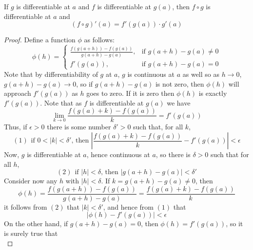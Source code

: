 \documentclass[12pt, a4paper, oneside, openright, titlepage]{book}
\begin{document}
\begin{thm}
    If $g$ is differentiable at $a$ and $f$ is differentiable at $g(a)$, then $f\circ g$ is differentiable at $a$ and $$(f\circ g)'(a) = f'(g(a))\cdot g'(a)$$
\end{thm}
\begin{proof}
    Define a function $\phi$ as follows: \begin{equation}
        \phi(h) = \left\{\begin{array}{ll}
            \frac{f(g(a+h)) - f(g(a))}{g(a+h)-g(a)}, & \text{if } g(a+h)-g(a) \neq 0 \\
            f'(g(a)), & \text{if } g(a+h) - g(a) = 0
        \end{array}\right.
    \end{equation}
    Note that by differentiability of $g$ at $a$, $g$ is continuous at $a$ as well so as $h\rightarrow 0$, $g(a+h)-g(a)\rightarrow 0$, so if $g(a+h)-g(a)$ is not zero, then $\phi(h)$ will approach $f'(g(a))$ as $h$ goes to zero. If it is zero then $\phi(h)$ is exactly $f'(g(a))$. Note that as $f$ is differentiable at $g(a)$ we have $$\lim\limits_{k\rightarrow 0}\frac{f(g(a) + k) - f(g(a))}{k} = f'(g(a))$$
    Thus, if $\epsilon > 0$ there is some number $\delta' > 0$ such that, for all $k$, \begin{equation*}
        (1)\hspace{5pt}\text{if $0 < |k| < \delta'$, then } \left|\frac{f(g(a) + k) - f(g(a))}{k} - f'(g(a))\right| < \epsilon
    \end{equation*}
    Now, $g$ is differentiable at $a$, hence continuous at $a$, so there is $\delta > 0$ such that for all $h$, \begin{equation*}
        (2)\hspace{5pt}\text{if $|h| < \delta$, then } |g(a+h) - g(a)| < \delta'
    \end{equation*}
    Consider now any $h$ with $|h| < \delta$. If $k = g(a+h) - g(a) \neq 0$, then \begin{equation*}
        \phi(h) = \frac{f(g(a+h)) - f(g(a))}{g(a+h) - g(a)} = \frac{f(g(a)+k) - f(g(a))}{k}
    \end{equation*}
    it follows from $(2)$ that $|k| < \delta'$, and hence from $(1)$ that \begin{equation*}
        |\phi(h) - f'(g(a))| < \epsilon
    \end{equation*}
    On the other hand, if $g(a+h) - g(a) = 0$, then $\phi(h) = f'(g(a))$, so it is surely true that \begin{equation*}

\end{equation*}
\end{proof}
\end{document}
